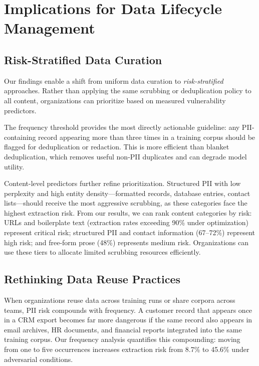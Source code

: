 \documentclass[conference]{IEEEtran}
\begin{document}
\section{Implications for Data Lifecycle Management}
\label{sec:implications}

\subsection{Risk-Stratified Data Curation}

Our findings enable a shift from uniform data curation to \emph{risk-stratified} approaches. Rather than applying the same scrubbing or deduplication policy to all content, organizations can prioritize based on measured vulnerability predictors.

The frequency threshold provides the most directly actionable guideline: any PII-containing record appearing more than three times in a training corpus should be flagged for deduplication or redaction. This is more efficient than blanket deduplication, which removes useful non-PII duplicates and can degrade model utility.

Content-level predictors further refine prioritization. Structured PII with low perplexity and high entity density---formatted records, database entries, contact lists---should receive the most aggressive scrubbing, as these categories face the highest extraction risk. From our results, we can rank content categories by risk: URLs and boilerplate text (extraction rates exceeding 90\% under optimization) represent critical risk; structured PII and contact information (67--72\%) represent high risk; and free-form prose (48\%) represents medium risk. Organizations can use these tiers to allocate limited scrubbing resources efficiently.

\subsection{Rethinking Data Reuse Practices}

When organizations reuse data across training runs or share corpora across teams, PII risk compounds with frequency. A customer record that appears once in a CRM export becomes far more dangerous if the same record also appears in email archives, HR documents, and financial reports integrated into the same training corpus. Our frequency analysis quantifies this compounding: moving from one to five occurrences increases extraction risk from 8.7\% to 45.6\% under adversarial conditions.
\end{document}
